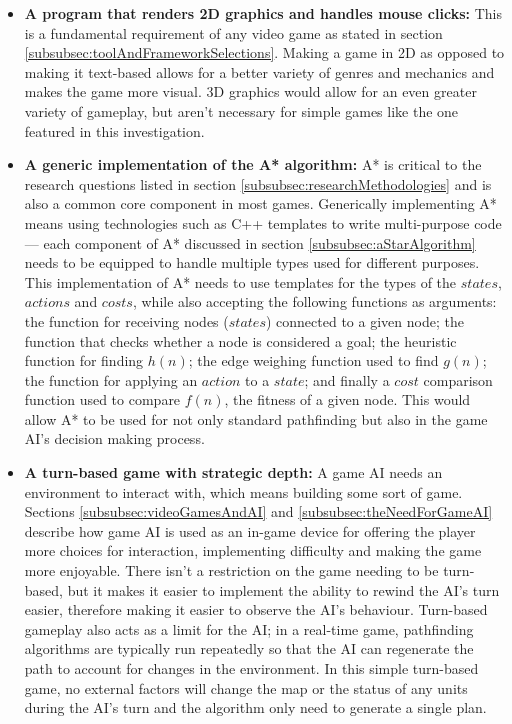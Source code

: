 \documentclass[11pt, a4paper]{article}
\begin{document}
\begin{itemize}

\item \textbf{A program that renders 2D graphics and handles mouse clicks:}
This is a fundamental requirement of any video game as stated in section \ref{subsubsec:toolAndFrameworkSelections}. Making a game in 2D as opposed to making it text-based allows for a better variety of genres and mechanics and makes the game more visual. 3D graphics would allow for an even greater variety of gameplay, but aren't necessary for simple games like the one featured in this investigation.

\item \textbf{A generic implementation of the A* algorithm:}
A* is critical to the research questions listed in section \ref{subsubsec:researchMethodologies} and is also a common core component in most games. Generically implementing A* means using technologies such as C++ templates to write multi-purpose code --- each component of A* discussed in section \ref{subsubsec:aStarAlgorithm} needs to be equipped to handle multiple types used for different purposes. This implementation of A* needs to use templates for the types of the $states$, $actions$ and $costs$, while also accepting the following functions as arguments: the function for receiving nodes ($states$) connected to a given node; the function that checks whether a node is considered a goal; the heuristic function for finding $h(n)$; the edge weighing function used to find $g(n)$; the function for applying an $action$ to a $state$; and finally a $cost$ comparison function used to compare $f(n)$, the fitness of a given node. This would allow A* to be used for not only standard pathfinding but also in the game AI's decision making process.

\item \textbf{A turn-based game with strategic depth:}
A game AI needs an environment to interact with, which means building some sort of game. Sections \ref{subsubsec:videoGamesAndAI} and \ref{subsubsec:theNeedForGameAI} describe how game AI is used as an in-game device for offering the player more choices for interaction, implementing difficulty and making the game more enjoyable. There isn't a restriction on the game needing to be turn-based, but it makes it easier to implement the ability to rewind the AI's turn easier, therefore making it easier to observe the AI's behaviour. Turn-based gameplay also acts as a limit for the AI; in a real-time game, pathfinding algorithms are typically run repeatedly so that the AI can regenerate the path to account for changes in the environment. In this simple turn-based game, no external factors will change the map or the status of any units during the AI's turn and the algorithm only need to generate a single plan.


\end{itemize}
\end{document}
